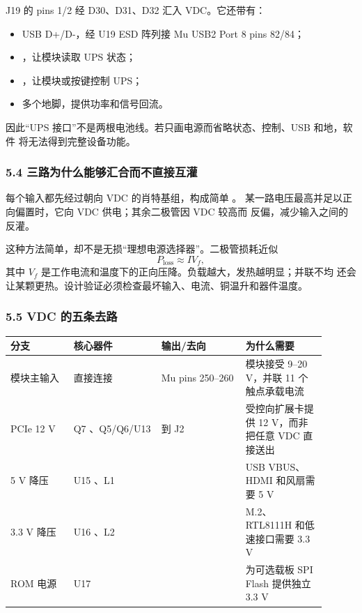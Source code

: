 J19 的  pins 1/2 经 D30、D31、D32 汇入 VDC。它还带有：

\begin{itemize}[leftmargin=2em]
  \item USB D+/D-，经 U19  ESD 阵列接 Mu USB2 Port 8
        pins 82/84；
  \item {}，让模块读取 UPS 状态；
  \item {}，让模块或按键控制 UPS；
  \item 多个地脚，提供功率和信号回流。
\end{itemize}

因此“UPS 接口”不是两根电池线。若只画电源而省略状态、控制、USB 和地，软件
将无法得到完整设备功能。

\subsubsection{5.4 三路为什么能够汇合而不直接互灌}

每个输入都先经过朝向 VDC 的肖特基组，构成简单
。
某一路电压最高并足以正向偏置时，它向 VDC 供电；其余二极管因 VDC 较高而
反偏，减少输入之间的反灌。

这种方法简单，却不是无损“理想电源选择器”。二极管损耗近似
\[
P_{\mathrm{loss}}\approx I V_f,
\]
其中 \(V_f\) 是工作电流和温度下的正向压降。负载越大，发热越明显；并联不均
还会让某颗更热。设计验证必须检查最坏输入、电流、铜温升和器件温度。

\subsubsection{5.5 VDC 的五条去路}

\begin{longtable}{L{0.18\linewidth}L{0.25\linewidth}L{0.24\linewidth}L{0.23\linewidth}}
\toprule
分支 & 核心器件 & 输出/去向 & 为什么需要 \\
\midrule
模块主输入 & 直接连接 & Mu pins 250--260  & 模块接受 9--20 V，并联 11 个触点承载电流 \\
PCIe 12 V & Q7 、Q5/Q6/U13 &  到 J2 & 受控向扩展卡提供 12 V，而非把任意 VDC 直接送出 \\
5 V 降压 & U15 、L1 &  & USB VBUS、HDMI 和风扇需要 5 V \\
3.3 V 降压 & U16 、L2 &  & M.2、RTL8111H 和低速接口需要 3.3 V \\
ROM 电源 & U17  &  & 为可选载板 SPI Flash 提供独立 3.3 V \\
\bottomrule
\end{longtable}

